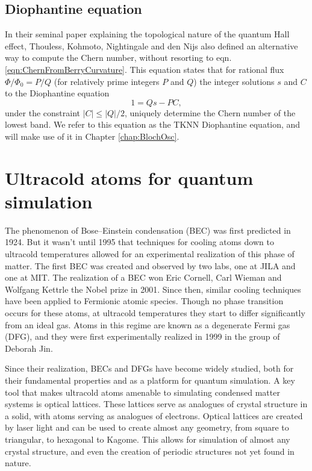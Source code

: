 \subsection{Diophantine equation} \label{sec:DiophantineIntro}	
In their seminal paper explaining the topological nature of the quantum Hall effect\cite{Thouless1982}, Thouless, Kohmoto, Nightingale and den Nijs also defined an alternative way to compute the Chern number, without resorting to eqn. \ref{eqn:ChernFromBerryCurvature}. 
This equation states that for rational flux $\Phi/\Phi_0 = P/Q$ (for relatively prime integers $P$ and $Q$) the integer solutions  $s$ and $C$ to the Diophantine equation
\begin{equation}
1 = Q s - P C,
\label{eqn:Diophantine}
\end{equation}  
under the constraint $|C|\leq |Q|/2$\cite{Thouless1982, Kohmoto1989}, uniquely determine the Chern number of the lowest band. We refer to this equation as the TKNN Diophantine equation, and will make use of it in Chapter \ref{chap:BlochOsc}. 

\section{Ultracold atoms for quantum simulation}
The phenomenon of Bose--Einstein condensation (BEC) was first predicted in 1924\cite{Bose1924}. But it wasn't until 1995 that techniques for cooling atoms down to ultracold temperatures allowed for an experimental realization of this phase of matter. The first BEC was created and observed by two labs, one at JILA \cite{Anderson1995} and one at MIT\cite{Davis1995}. The realization of a BEC won Eric Cornell, Carl Wieman and Wolfgang Kettrle the Nobel prize in 2001. Since then, similar cooling techniques have been applied to Fermionic atomic species. Though no phase transition occurs for these atoms, at ultracold temperatures they start to differ significantly from an ideal gas. Atoms in this regime are known as a degenerate Fermi gas (DFG), and they were first experimentally realized in 1999 in the group of Deborah Jin\cite{DeMarcoJin99,Truscott2001}. 

Since their realization, BECs and DFGs have become widely studied, both for their fundamental properties and as a platform for quantum simulation. A key tool that makes ultracold atoms amenable to simulating condensed matter systems is optical lattices. These lattices serve as analogues of crystal structure in a solid, with atoms serving as analogues of electrons. Optical lattices are created by laser light and can be used to create almost any geometry, from square\cite{Greiner2001} to triangular\cite{Becker2010,Struck2011}, to hexagonal\cite{Tarruell2012} to Kagome\cite{Liu2010}. This allows for simulation of almost any crystal structure, and even the creation of periodic structures not yet found in nature. 

